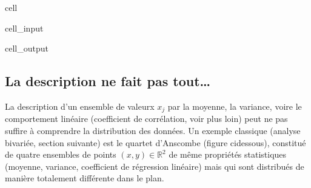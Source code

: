 \documentclass[letterpaper,10pt,english]{jupyterBook}
\begin{document}
\begin{sphinxuseclass}{cell}
\begin{sphinxVerbatimInput}
\begin{sphinxuseclass}{cell_input}
\begin{sphinxVerbatim}[commandchars=\\\{\}]
    

   
 
\end{sphinxVerbatim}

\end{sphinxuseclass}\end{sphinxVerbatimInput}
\begin{sphinxVerbatimOutput}

\begin{sphinxuseclass}{cell_output}
\noindent{}

\end{sphinxuseclass}\end{sphinxVerbatimOutput}

\end{sphinxuseclass}

\subsection{La description ne fait pas tout…}
\label{\detokenize{statsdescriptives:la-description-ne-fait-pas-tout}}
\sphinxAtStartPar
La description d’un ensemble de valeurx \(x_j\) par la moyenne, la variance, voire le comportement linéaire (coefficient de corrélation, voir plus loin) peut ne pas suffire à comprendre la distribution des données. Un exemple classique (analyse bivariée, section suivante) est le quartet d’Anscombe (figure ci\sphinxhyphen{}dessous), constitué de quatre ensembles de points  \((x,y)\in\mathbb{R}^2\) de même propriétés statistiques (moyenne, variance, coefficient de régression linéaire) mais qui sont distribués de manière totalement différente dans le plan.
\end{document}
